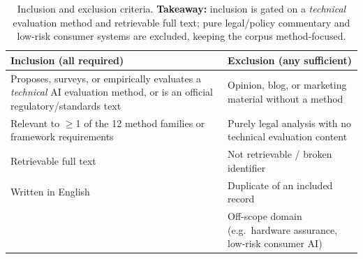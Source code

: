 \begin{table}[!tbp]
\centering
\caption{Inclusion and exclusion criteria. \textbf{Takeaway:} inclusion is gated on a
\emph{technical} evaluation method and retrievable full text; pure legal/policy commentary and
low-risk consumer systems are excluded, keeping the corpus method-focused.}
\label{tab:incl}
\footnotesize
\begin{tabular}{p{}p{}}
\toprule
Inclusion (all required) & Exclusion (any sufficient)\\
\midrule
Proposes, surveys, or empirically evaluates a \emph{technical} AI evaluation method, or is an official regulatory/standards text & Opinion, blog, or marketing material without a method\\
Relevant to $\geq$1 of the 12 method families or framework requirements & Purely legal analysis with no technical evaluation content\\
Retrievable full text & Not retrievable / broken identifier\\
Written in English & Duplicate of an included record\\
& Off-scope domain (e.g.\ hardware assurance, low-risk consumer AI)\\
\bottomrule
\end{tabular}
\end{table}
